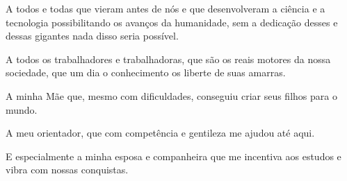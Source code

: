 \begin{agradecimentos}
	\par A todos e todas que vieram antes de nós e que desenvolveram a ciência e a tecnologia possibilitando os avanços da humanidade, sem a dedicação desses e dessas gigantes nada disso seria possível.
	\par A todos os trabalhadores e trabalhadoras, que são os reais motores da nossa sociedade, que um dia o conhecimento os liberte de suas amarras.
	\par A minha Mãe que, mesmo com dificuldades, conseguiu criar seus filhos para o mundo.
	\par A meu orientador, que com competência e gentileza me ajudou até aqui.\\
	\par E especialmente a minha esposa e companheira que me incentiva aos estudos e vibra com nossas conquistas.
\end{agradecimentos}